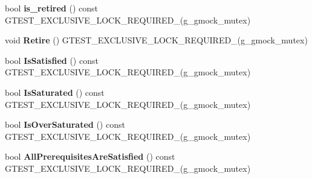 \begin{DoxyCompactItemize}
\item 
bool {\bfseries is\+\_\+retired} () const G\+T\+E\+S\+T\+\_\+\+E\+X\+C\+L\+U\+S\+I\+V\+E\+\_\+\+L\+O\+C\+K\+\_\+\+R\+E\+Q\+U\+I\+R\+E\+D\+\_\+(g\+\_\+gmock\+\_\+mutex)\hypertarget{classtesting_1_1internal_1_1ExpectationBase_afe539dbc5b29d9635403767a4708c476}{}\label{classtesting_1_1internal_1_1ExpectationBase_afe539dbc5b29d9635403767a4708c476}

\item 
void {\bfseries Retire} () G\+T\+E\+S\+T\+\_\+\+E\+X\+C\+L\+U\+S\+I\+V\+E\+\_\+\+L\+O\+C\+K\+\_\+\+R\+E\+Q\+U\+I\+R\+E\+D\+\_\+(g\+\_\+gmock\+\_\+mutex)\hypertarget{classtesting_1_1internal_1_1ExpectationBase_a0aeeb4c1e66c2f2aa0853c267ad3e781}{}\label{classtesting_1_1internal_1_1ExpectationBase_a0aeeb4c1e66c2f2aa0853c267ad3e781}

\item 
bool {\bfseries Is\+Satisfied} () const G\+T\+E\+S\+T\+\_\+\+E\+X\+C\+L\+U\+S\+I\+V\+E\+\_\+\+L\+O\+C\+K\+\_\+\+R\+E\+Q\+U\+I\+R\+E\+D\+\_\+(g\+\_\+gmock\+\_\+mutex)\hypertarget{classtesting_1_1internal_1_1ExpectationBase_ae629adc2dd9aee0ac62e50314f1a6449}{}\label{classtesting_1_1internal_1_1ExpectationBase_ae629adc2dd9aee0ac62e50314f1a6449}

\item 
bool {\bfseries Is\+Saturated} () const G\+T\+E\+S\+T\+\_\+\+E\+X\+C\+L\+U\+S\+I\+V\+E\+\_\+\+L\+O\+C\+K\+\_\+\+R\+E\+Q\+U\+I\+R\+E\+D\+\_\+(g\+\_\+gmock\+\_\+mutex)\hypertarget{classtesting_1_1internal_1_1ExpectationBase_ad3e4340cedefdc24fce1478a8d6cab93}{}\label{classtesting_1_1internal_1_1ExpectationBase_ad3e4340cedefdc24fce1478a8d6cab93}

\item 
bool {\bfseries Is\+Over\+Saturated} () const G\+T\+E\+S\+T\+\_\+\+E\+X\+C\+L\+U\+S\+I\+V\+E\+\_\+\+L\+O\+C\+K\+\_\+\+R\+E\+Q\+U\+I\+R\+E\+D\+\_\+(g\+\_\+gmock\+\_\+mutex)\hypertarget{classtesting_1_1internal_1_1ExpectationBase_a080dab35ecc6c57096f50758a0e8123d}{}\label{classtesting_1_1internal_1_1ExpectationBase_a080dab35ecc6c57096f50758a0e8123d}

\item 
bool {\bfseries All\+Prerequisites\+Are\+Satisfied} () const G\+T\+E\+S\+T\+\_\+\+E\+X\+C\+L\+U\+S\+I\+V\+E\+\_\+\+L\+O\+C\+K\+\_\+\+R\+E\+Q\+U\+I\+R\+E\+D\+\_\+(g\+\_\+gmock\+\_\+mutex)\hypertarget{classtesting_1_1internal_1_1ExpectationBase_a82ba68cdd71a8b5aff5a5be24c23a637}{}\label{classtesting_1_1internal_1_1ExpectationBase_a82ba68cdd71a8b5aff5a5be24c23a637}


\end{DoxyCompactItemize}
